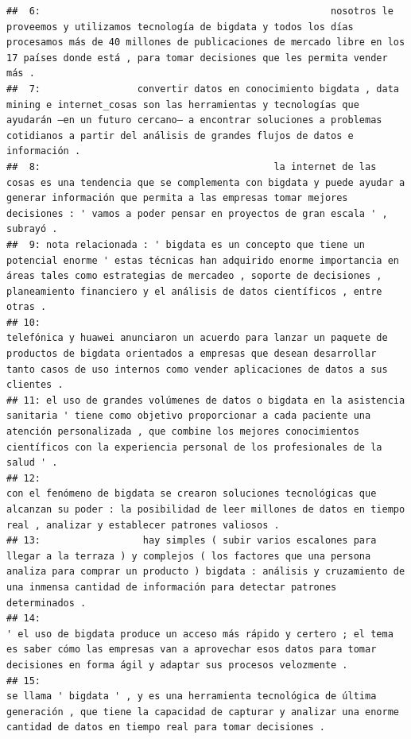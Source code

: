 \documentclass[
]{book}
\begin{document}
\begin{verbatim}
##  6:                                                   nosotros le proveemos y utilizamos tecnología de bigdata y todos los días procesamos más de 40 millones de publicaciones de mercado libre en los 17 países donde está , para tomar decisiones que les permita vender más .
##  7:                 convertir datos en conocimiento bigdata , data mining e internet_cosas son las herramientas y tecnologías que ayudarán –en un futuro cercano– a encontrar soluciones a problemas cotidianos a partir del análisis de grandes flujos de datos e información .
##  8:                                         la internet de las cosas es una tendencia que se complementa con bigdata y puede ayudar a generar información que permita a las empresas tomar mejores decisiones : ' vamos a poder pensar en proyectos de gran escala ' , subrayó .
##  9: nota relacionada : ' bigdata es un concepto que tiene un potencial enorme ' estas técnicas han adquirido enorme importancia en áreas tales como estrategias de mercadeo , soporte de decisiones , planeamiento financiero y el análisis de datos científicos , entre otras .
## 10:                                                         telefónica y huawei anunciaron un acuerdo para lanzar un paquete de productos de bigdata orientados a empresas que desean desarrollar tanto casos de uso internos como vender aplicaciones de datos a sus clientes .
## 11: el uso de grandes volúmenes de datos o bigdata en la asistencia sanitaria ' tiene como objetivo proporcionar a cada paciente una atención personalizada , que combine los mejores conocimientos científicos con la experiencia personal de los profesionales de la salud ' .
## 12:                                                                                    con el fenómeno de bigdata se crearon soluciones tecnológicas que alcanzan su poder : la posibilidad de leer millones de datos en tiempo real , analizar y establecer patrones valiosos .
## 13:                  hay simples ( subir varios escalones para llegar a la terraza ) y complejos ( los factores que una persona analiza para comprar un producto ) bigdata : análisis y cruzamiento de una inmensa cantidad de información para detectar patrones determinados .
## 14:                                                                          ' el uso de bigdata produce un acceso más rápido y certero ; el tema es saber cómo las empresas van a aprovechar esos datos para tomar decisiones en forma ágil y adaptar sus procesos velozmente .
## 15:                                                                             se llama ' bigdata ' , y es una herramienta tecnológica de última generación , que tiene la capacidad de capturar y analizar una enorme cantidad de datos en tiempo real para tomar decisiones .

\end{verbatim}
\end{document}

